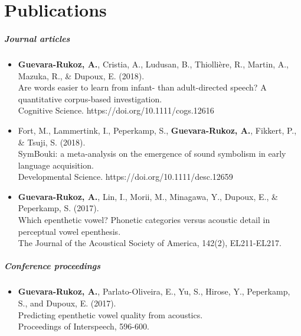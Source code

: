 \documentclass[12pt, twoside]{report}
\begin{document}
\chapter*{Publications}

\paragraph{Journal articles}
\begin{itemize}
\item \textbf{Guevara-Rukoz, A.}, Cristia, A., Ludusan, B., Thiollière, R., Martin, A., Mazuka, R., \& Dupoux, E. (2018). \\
  Are words easier to learn from infant- than adult-directed speech? A quantitative corpus-based investigation. \\
  Cognitive Science. https://doi.org/10.1111/cogs.12616
\item Fort, M., Lammertink, I., Peperkamp, S., \textbf{Guevara-Rukoz, A.}, Fikkert, P., \& Tsuji, S. (2018). \\
  SymBouki: a meta-analysis on the emergence of sound symbolism in early language acquisition. \\
  Developmental Science. https://doi.org/10.1111/desc.12659
\item \textbf{Guevara-Rukoz, A.}, Lin, I., Morii, M., Minagawa, Y., Dupoux, E., \& Peperkamp, S. (2017). \\
  Which epenthetic vowel? Phonetic categories versus acoustic detail in perceptual vowel epenthesis. \\
  The Journal of the Acoustical Society of America, 142(2), EL211-EL217.
\end{itemize}
\paragraph{Conference proceedings}
\begin{itemize}
\item \textbf{Guevara-Rukoz, A.}, Parlato-Oliveira, E., Yu, S., Hirose, Y., Peperkamp, S., and Dupoux, E. (2017). \\
  Predicting epenthetic vowel quality from acoustics. \\
  Proceedings of Interspeech, 596-600.
\end{itemize}

\dominitoc[n]%
\nomtcrule
\setlength{\mtcindent}{-1.5em}
\setcounter{minitocdepth}{2}
\end{document}
